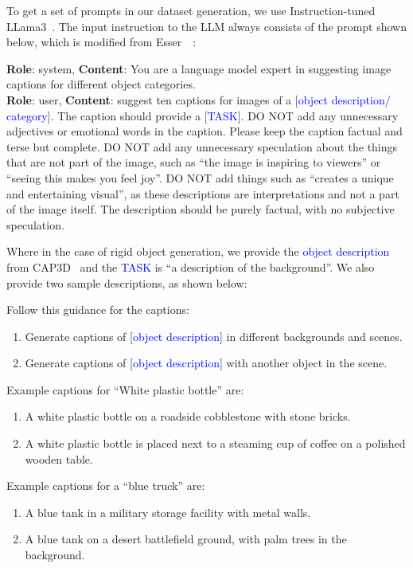 To get a set of prompts in our dataset generation, we use Instruction-tuned LLama3~\cite{dubey2024llama}. The input instruction to the LLM always consists of the prompt shown below, which is modified from Esser~\etal~\cite{esser2024scaling}: 
\begin{tcolorbox}
\textbf{Role}: system, \textbf{Content}: You are a language model expert in suggesting image captions for different object categories.\\
\textbf{Role}: user, \textbf{Content}: suggest ten captions for images of a [\textcolor{blue}{object description/ category}]. The caption should provide a [\textcolor{blue}{TASK}]. DO NOT add any unnecessary adjectives or emotional words in the caption. Please keep the caption factual and terse but complete. DO NOT add any unnecessary speculation about the things that are not part of the image, such as ``the image is inspiring to viewers'' or ``seeing this makes you feel joy''. DO NOT add things such as ``creates a unique and entertaining visual'', as these descriptions are interpretations and not a part of the image itself. The description should be purely factual, with no subjective speculation.
\end{tcolorbox}

Where in the case of rigid object generation, we provide the \textcolor{blue}{object description} from CAP3D~\cite{luo2024scalable} and the \textcolor{blue}{TASK} is ``a description of the background''. We also provide two sample descriptions, as shown below: 
\begin{tcolorbox}
Follow this guidance for the captions: 
\begin{enumerate}
    \item Generate captions of [\textcolor{blue}{object description}] in different backgrounds and scenes. 
    \item Generate captions of [\textcolor{blue}{object description}] with another object in the scene. 
\end{enumerate}

Example captions for ``White plastic bottle'' are:
\begin{enumerate}
    \item A white plastic bottle on a roadside cobblestone with stone bricks.
    \item A white plastic bottle is placed next to a steaming cup of coffee on a polished wooden table.
\end{enumerate}

Example captions for a ``blue truck'' are:
\begin{enumerate}
    \item A blue tank in a military storage facility with metal walls.
    \item A blue tank on a desert battlefield ground, with palm trees in the background.
\end{enumerate}

\end{tcolorbox}

